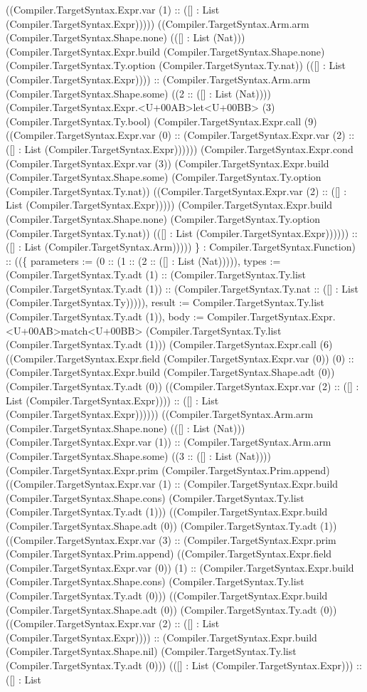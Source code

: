 \documentclass[11pt]{article}
\begin{document}
((Compiler.TargetSyntax.Expr.var (1) :: ([] : List (Compiler.TargetSyntax.Expr))))) ((Compiler.TargetSyntax.Arm.arm (Compiler.TargetSyntax.Shape.none) (([] : List (Nat))) (Compiler.TargetSyntax.Expr.build (Compiler.TargetSyntax.Shape.none) (Compiler.TargetSyntax.Ty.option (Compiler.TargetSyntax.Ty.nat)) (([] : List (Compiler.TargetSyntax.Expr)))) :: (Compiler.TargetSyntax.Arm.arm (Compiler.TargetSyntax.Shape.some) ((2 :: ([] : List (Nat)))) (Compiler.TargetSyntax.Expr.<U+00AB>let<U+00BB> (3) (Compiler.TargetSyntax.Ty.bool) (Compiler.TargetSyntax.Expr.call (9) ((Compiler.TargetSyntax.Expr.var (0) :: (Compiler.TargetSyntax.Expr.var (2) :: ([] : List (Compiler.TargetSyntax.Expr)))))) (Compiler.TargetSyntax.Expr.cond (Compiler.TargetSyntax.Expr.var (3)) (Compiler.TargetSyntax.Expr.build (Compiler.TargetSyntax.Shape.some) (Compiler.TargetSyntax.Ty.option (Compiler.TargetSyntax.Ty.nat)) ((Compiler.TargetSyntax.Expr.var (2) :: ([] : List (Compiler.TargetSyntax.Expr))))) (Compiler.TargetSyntax.Expr.build (Compiler.TargetSyntax.Shape.none) (Compiler.TargetSyntax.Ty.option (Compiler.TargetSyntax.Ty.nat)) (([] : List (Compiler.TargetSyntax.Expr)))))) :: ([] : List (Compiler.TargetSyntax.Arm))))) \} : Compiler.TargetSyntax.Function) :: ((\{ parameters := (0 :: (1 :: (2 :: ([] : List (Nat))))), types := (Compiler.TargetSyntax.Ty.adt (1) :: (Compiler.TargetSyntax.Ty.list (Compiler.TargetSyntax.Ty.adt (1)) :: (Compiler.TargetSyntax.Ty.nat :: ([] : List (Compiler.TargetSyntax.Ty))))), result := Compiler.TargetSyntax.Ty.list (Compiler.TargetSyntax.Ty.adt (1)), body := Compiler.TargetSyntax.Expr.<U+00AB>match<U+00BB> (Compiler.TargetSyntax.Ty.list (Compiler.TargetSyntax.Ty.adt (1))) (Compiler.TargetSyntax.Expr.call (6) ((Compiler.TargetSyntax.Expr.field (Compiler.TargetSyntax.Expr.var (0)) (0) :: (Compiler.TargetSyntax.Expr.build (Compiler.TargetSyntax.Shape.adt (0)) (Compiler.TargetSyntax.Ty.adt (0)) ((Compiler.TargetSyntax.Expr.var (2) :: ([] : List (Compiler.TargetSyntax.Expr)))) :: ([] : List (Compiler.TargetSyntax.Expr)))))) ((Compiler.TargetSyntax.Arm.arm (Compiler.TargetSyntax.Shape.none) (([] : List (Nat))) (Compiler.TargetSyntax.Expr.var (1)) :: (Compiler.TargetSyntax.Arm.arm (Compiler.TargetSyntax.Shape.some) ((3 :: ([] : List (Nat)))) (Compiler.TargetSyntax.Expr.prim (Compiler.TargetSyntax.Prim.append) ((Compiler.TargetSyntax.Expr.var (1) :: (Compiler.TargetSyntax.Expr.build (Compiler.TargetSyntax.Shape.cons) (Compiler.TargetSyntax.Ty.list (Compiler.TargetSyntax.Ty.adt (1))) ((Compiler.TargetSyntax.Expr.build (Compiler.TargetSyntax.Shape.adt (0)) (Compiler.TargetSyntax.Ty.adt (1)) ((Compiler.TargetSyntax.Expr.var (3) :: (Compiler.TargetSyntax.Expr.prim (Compiler.TargetSyntax.Prim.append) ((Compiler.TargetSyntax.Expr.field (Compiler.TargetSyntax.Expr.var (0)) (1) :: (Compiler.TargetSyntax.Expr.build (Compiler.TargetSyntax.Shape.cons) (Compiler.TargetSyntax.Ty.list (Compiler.TargetSyntax.Ty.adt (0))) ((Compiler.TargetSyntax.Expr.build (Compiler.TargetSyntax.Shape.adt (0)) (Compiler.TargetSyntax.Ty.adt (0)) ((Compiler.TargetSyntax.Expr.var (2) :: ([] : List (Compiler.TargetSyntax.Expr)))) :: (Compiler.TargetSyntax.Expr.build (Compiler.TargetSyntax.Shape.nil) (Compiler.TargetSyntax.Ty.list (Compiler.TargetSyntax.Ty.adt (0))) (([] : List (Compiler.TargetSyntax.Expr))) :: ([] : List 
\end{document}

